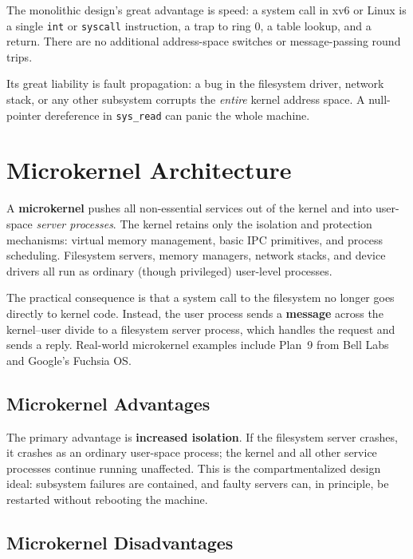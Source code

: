 \documentclass[11pt]{article}
\begin{document}
The monolithic design's great advantage is speed: a system call in xv6 or Linux is a single \texttt{int} or \texttt{syscall} instruction, a trap to ring 0, a table lookup, and a return. There are no additional address-space switches or message-passing round trips.

Its great liability is fault propagation: a bug in the filesystem driver, network stack, or any other subsystem corrupts the \emph{entire} kernel address space. A null-pointer dereference in \texttt{sys\_read} can panic the whole machine.

\section{Microkernel Architecture}

A \textbf{microkernel} pushes all non-essential services out of the kernel and into user-space \emph{server processes}. The kernel retains only the isolation and protection mechanisms: virtual memory management, basic IPC primitives, and process scheduling. Filesystem servers, memory managers, network stacks, and device drivers all run as ordinary (though privileged) user-level processes.

The practical consequence is that a system call to the filesystem no longer goes directly to kernel code. Instead, the user process sends a \textbf{message} across the kernel--user divide to a filesystem server process, which handles the request and sends a reply. Real-world microkernel examples include Plan~9 from Bell Labs and Google's Fuchsia OS.

\subsection{Microkernel Advantages}

The primary advantage is \textbf{increased isolation}. If the filesystem server crashes, it crashes as an ordinary user-space process; the kernel and all other service processes continue running unaffected. This is the compartmentalized design ideal: subsystem failures are contained, and faulty servers can, in principle, be restarted without rebooting the machine.

\subsection{Microkernel Disadvantages}
\end{document}
